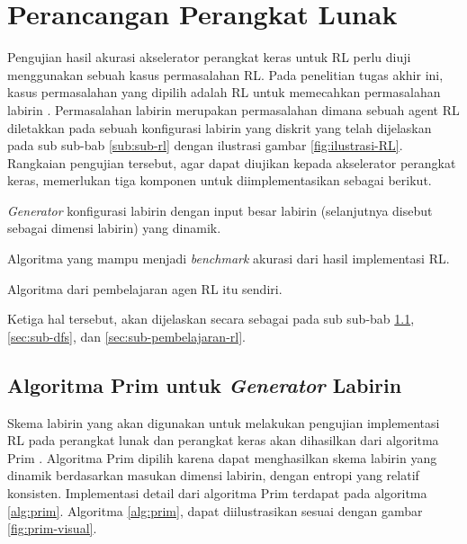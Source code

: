 \section{Perancangan Perangkat Lunak}
\label{sec:perancangan-perangkat-lunak}

Pengujian hasil akurasi akselerator perangkat keras untuk \ac{RL} perlu diuji menggunakan sebuah kasus permasalahan \ac{RL}. Pada penelitian tugas akhir ini, kasus permasalahan yang dipilih adalah \ac{RL} untuk memecahkan permasalahan labirin \parencite{mini2023understanding}. Permasalahan labirin merupakan permasalahan dimana sebuah agent \ac{RL} diletakkan pada sebuah konfigurasi labirin yang diskrit yang telah dijelaskan pada sub sub-bab \ref{sub:sub-rl} dengan ilustrasi gambar \ref{fig:ilustrasi-RL}. Rangkaian pengujian tersebut, agar dapat diujikan kepada akselerator perangkat keras, memerlukan tiga komponen untuk diimplementasikan sebagai berikut.

\vspace{-5mm}
\begin{enumerate}
\end{enumerate}

Ketiga hal tersebut, akan dijelaskan secara sebagai pada sub sub-bab \ref{sec:sub-prim}, \ref{sec:sub-dfs}, dan \ref{sec:sub-pembelajaran-rl}.

\subsection{Algoritma Prim untuk \textit{Generator} Labirin}
\label{sec:sub-prim}

Skema labirin yang akan digunakan untuk melakukan pengujian implementasi \ac{RL} pada perangkat lunak dan perangkat keras akan dihasilkan dari algoritma Prim \parencite{devian2013implementasi}. Algoritma Prim dipilih karena dapat menghasilkan skema labirin yang dinamik berdasarkan masukan dimensi labirin, dengan entropi yang relatif konsisten. Implementasi detail dari algoritma Prim terdapat pada algoritma \ref{alg:prim}. Algoritma \ref{alg:prim}, dapat diilustrasikan sesuai dengan gambar \ref{fig:prim-visual}.

